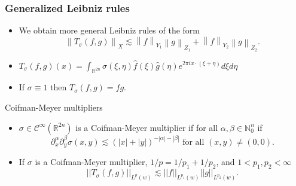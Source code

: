 \documentclass[xcolor=dvipsnames]{beamer}
\newcommand{\norm}[2]{{\left\| #1 \right\|}_{#2}}
\newcommand{\hcline}{1/p=1/p_1+1/p_2}
\begin{document}
\begin{frame}\frametitle{Generalized Leibniz rules}

\begin{itemize}
\item We obtain more general Leibniz rules of the form
\[ \norm{T_\sigma(f,g)}{X} \lesssim \norm{f}{Y_1}\norm{g}{Z_1}+\norm{f}{Y_2}\norm{g}{Z_2}. \]

\item $T_\sigma(f,g)(x) = \int_{\mathbb{R}^{2n}} \sigma(\xi,\eta) \widehat{f}(\xi)\widehat{g}(\eta) e^{2\pi i x\cdot (\xi + \eta)} d\xi d\eta$
\bigskip
\item If $\sigma \equiv 1$ then $T_\sigma(f,g) = fg.$
\end{itemize}

\end{frame}

\begin{frame}{Coifman-Meyer multipliers}
\begin{itemize}
\item $\sigma \in \mathcal{C}^\infty(\mathbb{R}^{2n})$ is a Coifman-Meyer multiplier if for all $\alpha,\beta \in \mathbb{N}^n_0$ if 
\[ \partial^\alpha_x \partial^\beta_y \sigma(x,y) \lesssim (|x| + |y|)^{-|\alpha| - |\beta|} \text{ for all } (x,y)\neq (0,0). \]

\bigskip

\item If $\sigma$ is a Coifman-Meyer multiplier, $\hcline$, and $1<p_1,p_2<\infty$ \[||T_\sigma(f,g)||_{L^p(w)} \lesssim ||f||_{L^{p_1}(w)} ||g||_{L^{p_2}(w)}.\]
\end{itemize}

\end{frame}
\end{document}
